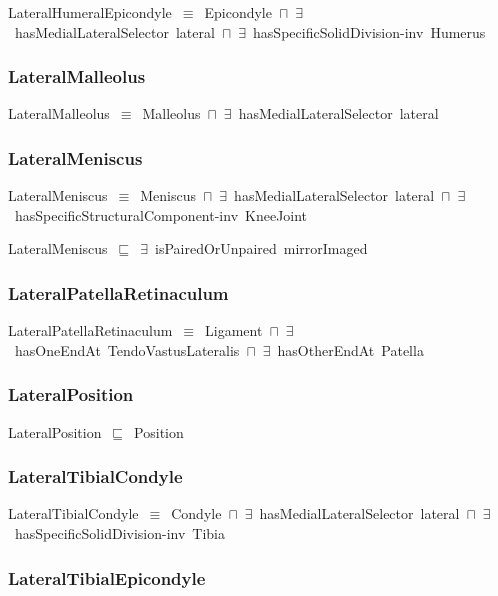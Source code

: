 \documentclass{article}
\begin{document}
LateralHumeralEpicondyle~\ensuremath{\equiv}~Epicondyle~\ensuremath{\sqcap}~\ensuremath{\exists}~hasMedialLateralSelector~lateral~\ensuremath{\sqcap}~\ensuremath{\exists}~hasSpecificSolidDivision-inv~Humerus

\subsubsection*{LateralMalleolus}

LateralMalleolus~\ensuremath{\equiv}~Malleolus~\ensuremath{\sqcap}~\ensuremath{\exists}~hasMedialLateralSelector~lateral

\subsubsection*{LateralMeniscus}

LateralMeniscus~\ensuremath{\equiv}~Meniscus~\ensuremath{\sqcap}~\ensuremath{\exists}~hasMedialLateralSelector~lateral~\ensuremath{\sqcap}~\ensuremath{\exists}~hasSpecificStructuralComponent-inv~KneeJoint

LateralMeniscus~\ensuremath{\sqsubseteq}~\ensuremath{\exists}~isPairedOrUnpaired~mirrorImaged~

\subsubsection*{LateralPatellaRetinaculum}

LateralPatellaRetinaculum~\ensuremath{\equiv}~Ligament~\ensuremath{\sqcap}~\ensuremath{\exists}~hasOneEndAt~TendoVastusLateralis~\ensuremath{\sqcap}~\ensuremath{\exists}~hasOtherEndAt~Patella

\subsubsection*{LateralPosition}

LateralPosition~\ensuremath{\sqsubseteq}~Position~

\subsubsection*{LateralTibialCondyle}

LateralTibialCondyle~\ensuremath{\equiv}~Condyle~\ensuremath{\sqcap}~\ensuremath{\exists}~hasMedialLateralSelector~lateral~\ensuremath{\sqcap}~\ensuremath{\exists}~hasSpecificSolidDivision-inv~Tibia

\subsubsection*{LateralTibialEpicondyle}
\end{document}
